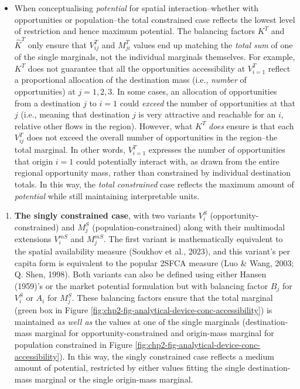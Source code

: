 \documentclass[
11pt, %
oneside, %
english, %
singlespacing, %
]{macthesis} %
\def\tightlist{}
\begin{document}
\begin{itemize}
\tightlist
\item
  When conceptualising \emph{potential} for spatial interaction--whether with opportunities or population--the total constrained case reflects the lowest level of restriction and hence maximum potential. The balancing factors \(K^T\) and \(\hat K^T\) only ensure that \(V_{ij}^T\) and \(M_{ji}^T\) values end up matching the \emph{total sum} of one of the single marginals, not the individual marginals themselves. For example, \(K^T\) does not guarantee that all the opportunities accessibility at \(V_{i=1}^T\) reflect a proportional allocation of the destination mass (i.e., \emph{number} of opportunities) at \(j=1, 2, 3\). In some cases, an allocation of opportunities from a destination \(j\) to \(i=1\) could \emph{exceed} the number of opportunities at that \(j\) (i.e., meaning that destination \(j\) is very attractive and reachable for an \(i\), relative other flows in the region). However, what \(K^T\) \emph{does} ensure is that each \(V_{ij}^T\) does not exceed the overall number of opportunities in the region--the total marginal. In other words, \(V_{i=1}^T\) expresses the number of opportunities that origin \(i=1\) could potentially interact with, as drawn from the entire regional opportunity mass, rather than constrained by individual destination totals. In this way, the \emph{total constrained} case reflects the maximum amount of \emph{potential} while still maintaining interpretable units.
\end{itemize}

\begin{enumerate}
\def\labelenumi{\arabic{enumi}.}
\setcounter{enumi}{2}
\tightlist
\item
  \textbf{The singly constrained case}, with two variants \(V_i^S\) (opportunity-constrained) and \(M_j^S\) (population-constrained) along with their multimodal extensions \(V_i^{mS}\) and \(M_j^{mS}\). The first variant is mathematically equivalent to the spatial availability measure (Soukhov et al., 2023), and this variant's per capita form is equivalent to the popular 2SFCA measure (Luo \& Wang, 2003; Q. Shen, 1998). Both variants can also be defined using either Hansen (1959)'s or the market potential formulation but with balancing factor \(B_j\) for \(V_i^S\) or \(A_i\) for \(M_j^S\). These balancing factors ensure that the total marginal (green box in Figure \ref{fig:chp2-fig-analytical-device-conc-accessibility}) is maintained \emph{as well as} the values at one of the single marginals (destination-mass marginal for opportunity-constrained and origin-mass marginal for population constrained in Figure \ref{fig:chp2-fig-analytical-device-conc-accessibility}). In this way, the singly constrained case reflects a medium amount of potential, restricted by either values fitting the single destination-mass marginal or the single origin-mass marginal.
\end{enumerate}
\end{document}
